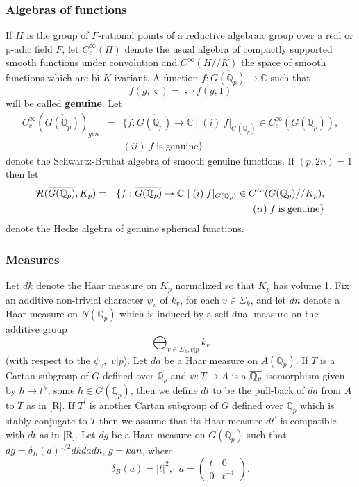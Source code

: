 \documentclass[12pt]{article}
\def\qqq{\mathbb{Q}}
\def\ccc{\mathbb{C}}
\begin{document}
\subsubsection{Algebras of functions}

If $H$ is the group of $F$-rational points of a reductive algebraic group
over a real or p-adic field $F$, let $C_c^\infty (H)$ denote the usual
algebra of compactly supported smooth functions under convolution and $%
C^\infty (H//K)$ the space of smooth functions which are bi-$K$-ivariant. A
function $f:\overline{G(\qqq_p)}\rightarrow \ccc $ such that 
\begin{equation}
f(g,\varsigma )=\varsigma \cdot f(g,1)
\end{equation}
will be called {\bf genuine}. Let 
\begin{eqnarray*}
C_c^\infty (\overline{G(\qqq_p)})_{gen}
&=&\{f:\overline{G(\qqq_p)}%
\rightarrow \ccc \
|\;(i)\;f|_{G(\qqq_p)}\in C_c^\infty (G(\qqq_p)),
\\
&&(ii)\;f\;\mathrm{is\;genuine}\}
\end{eqnarray*}
denote the Schwartz-Bruhat algebra of smooth genuine functions.
If $(p,2n)=1$ then let 
\begin{eqnarray*}
{\cal{H}}(\overline{G(\qqq_p)},K_p)
&=&\{f:\overline{G(\qqq_p)}\rightarrow \ccc 
\ |\;(i)\;f|_{G(\qqq_p)}\in
C^\infty (G(\qqq_p)//K_p), \\
&&\ (ii)\;f\;\mathrm{is\;genuine}\}
\end{eqnarray*}
denote the Hecke algebra of genuine spherical functions.

\subsubsection{Measures}

Let $dk$ denote the Haar measure on $K_p$ normalized so that $K_p$ has
volume 1. Fix an additive non-trivial character $\psi _v$ of $k_v$, for each$%
\;v\in \Sigma _k$, and let $dn$ denote a Haar measure on $N(\qqq_p)$
which is induced by a self-dual measure on the additive group 
\[
\bigoplus_{v\in \Sigma _k, v|p}k_v
\]
(with respect to the $\psi _v,$ $v|p$).
Let $da$ be a Haar measure on $A(\qqq_p)$. If $T$ is a Cartan subgroup of 
$G$ defined over $\qqq_p$ and $\psi :T\rightarrow A$ is a $\overline{\mathbb{%
Q}_p}$-isomorphism given by $h\longmapsto t^h$, some $h\in G(\qqq_p)$,
then we define $dt$ to be the pull-back of $da$ from $A$ to $T$ as in [R].
If $T^{\prime }$ is another Cartan subgroup of $G$ defined over $\qqq_p$
which is stably conjugate to $T$ then we assume that its Haar measure
$dt^{\prime }$ is compatible with $dt$ as in [R]. Let $dg$ be a Haar measure
on $G(\qqq_p)$ such that $dg=\delta _B(a)^{1/2}dkdadn$, $g=kan$, where 
\begin{equation}
\delta _B(a)=|t|^2,\;\;a=\left( 
\begin{array}{cc}
t & 0 \\ 
0 & t^{-1}
\end{array}
\right) .
\end{equation}
\end{document}
